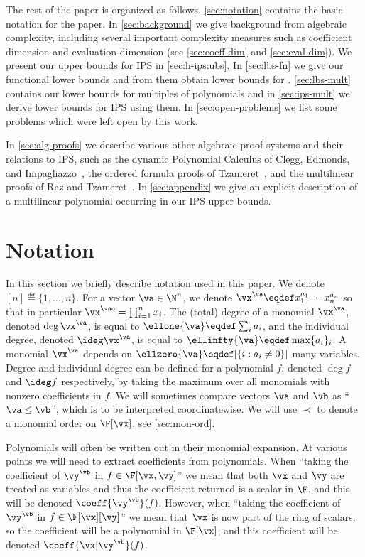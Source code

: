 \documentclass{toc}
\begin{document}
The rest of the paper is organized as follows.
\autoref{sec:notation} contains the basic notation for the paper. In
\autoref{sec:background}
we give background from algebraic complexity, including several important complexity measures such as coefficient dimension and evaluation dimension
(see \autoref{sec:coeff-dim}
and \autoref{sec:eval-dim}). We present our upper bounds for IPS in \autoref{sec:h-ips:ubs}. In \autoref{sec:lbs-fn}
we give our functional lower bounds and from them obtain lower bounds for
\lIPS. \autoref{sec:lbs-mult}
contains our lower bounds for multiples of polynomials and in \autoref{sec:ips-mult} we derive lower bounds for IPS using them.  In
\autoref{sec:open-problems}
we list some problems which were left open by this work.

In \autoref{sec:alg-proofs} we describe various other algebraic proof systems and their relations to IPS, such as the dynamic Polynomial Calculus of Clegg, Edmonds, and Impagliazzo~\cite{CleggEI96}, the ordered formula proofs of Tzameret~\cite{Tzameret11}, and the multilinear proofs of Raz and Tzameret~\cite{RazTzameret08a}. In \autoref{sec:appendix} we give an explicit description of a multilinear polynomial occurring in our IPS upper bounds.

\section{Notation}\label{sec:notation}

In this section we briefly describe notation used in this paper. We denote $[n]\eqdef\{1,\ldots,n\}$.  For a vector $\va\in\N^n$, we denote $\vx^\va\eqdef x_1^{a_1}\cdots x_n^{a_n}$ so that in particular $\vx^\vno=\prod_{i=1}^n x_i$. The (total) degree of a monomial $\vx^\va$, denoted $\deg\vx^\va$, is equal to $\ellone{\va}\eqdef\sum_i a_i$, and the individual degree, denoted $\ideg \vx^\va$, is equal to $\ellinfty{\va}\eqdef\max\{a_i\}_i$. A monomial $\vx^\va$ depends on $\ellzero{\va}\eqdef|\{i:a_i\ne 0\}|$ many variables. Degree and individual degree can be defined for a polynomial $f$, denoted $\deg f$ and $\ideg f$ respectively, by taking the maximum over all monomials with nonzero coefficients in $f$. We will sometimes compare vectors $\va$ and $\vb$ as ``$\va\le\vb$'', which is to be interpreted
%
coordinatewise.  %
%
We will use $\prec$ to denote a monomial order on $\F[\vx]$, see \autoref{sec:mon-ord}.

Polynomials will often be written out in their monomial expansion.  At various points we will need to extract coefficients from polynomials.  When ``taking the coefficient of $\vy^\vb$ in $f\in\F[\vx,\vy]$'' we mean that both $\vx$ and $\vy$ are treated as variables and thus the coefficient returned is a scalar in $\F$, and this will be denoted $\coeff{\smash{\vy^\vb}}(f)$.  However, when ``taking the coefficient of $\vy^{\vb}$ in $f\in\F[\vx][\vy]$'' we mean that $\vx$ is now part of the ring of scalars, so the coefficient will be a polynomial in $\F[\vx]$, and this coefficient will be denoted $\coeff{\vx|\vy^\vb}(f)$.
\end{document}
